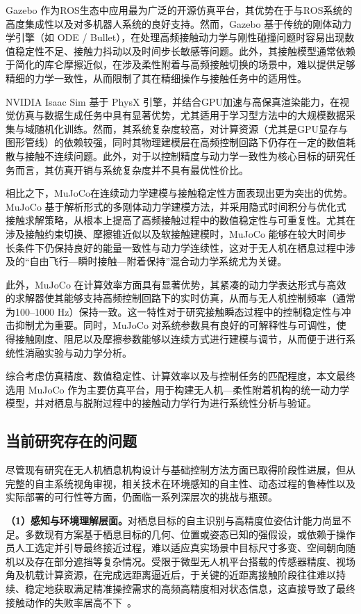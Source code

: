 Gazebo 作为ROS生态中应用最为广泛的开源仿真平台，其优势在于与ROS系统的高度集成性以及对多机器人系统的良好支持。然而，Gazebo 基于传统的刚体动力学引擎（如 ODE / Bullet），在处理高频接触动力学与刚性碰撞问题时容易出现数值稳定性不足、接触力抖动以及时间步长敏感等问题。此外，其接触模型通常依赖于简化的库仑摩擦近似，在涉及柔性附着与高频接触切换的场景中，难以提供足够精细的力学一致性，从而限制了其在精细操作与接触任务中的适用性。

NVIDIA Isaac Sim 基于 PhysX 引擎，并结合GPU加速与高保真渲染能力，在视觉仿真与数据生成任务中具有显著优势，尤其适用于学习型方法中的大规模数据采集与域随机化训练。然而，其系统复杂度较高，对计算资源（尤其是GPU显存与图形管线）的依赖较强，同时其物理建模层在高频控制回路下仍存在一定的数值耗散与接触不连续问题。此外，对于以控制精度与动力学一致性为核心目标的研究任务而言，其仿真开销与系统复杂度并不具有最优性价比。

相比之下，MuJoCo在连续动力学建模与接触稳定性方面表现出更为突出的优势。MuJoCo 基于解析形式的多刚体动力学建模方法，并采用隐式时间积分与优化式接触求解策略，从根本上提高了高频接触过程中的数值稳定性与可重复性。尤其在涉及接触约束切换、摩擦锥近似以及软接触建模时，MuJoCo 能够在较大时间步长条件下仍保持良好的能量一致性与动力学连续性，这对于无人机在栖息过程中涉及的“自由飞行—瞬时接触—附着保持”混合动力学系统尤为关键。

此外，MuJoCo 在计算效率方面具有显著优势，其紧凑的动力学表达形式与高效的求解器使其能够支持高频控制回路下的实时仿真，从而与无人机控制频率（通常为100–1000 Hz）保持一致。这一特性对于研究接触瞬态过程中的控制稳定性与冲击抑制尤为重要。同时，MuJoCo 对系统参数具有良好的可解释性与可调性，使得接触刚度、阻尼以及摩擦参数能够以连续方式进行建模与调节，从而便于进行系统性消融实验与动力学分析。

综合考虑仿真精度、数值稳定性、计算效率以及与控制任务的匹配程度，本文最终选用 MuJoCo 作为主要仿真平台，用于构建无人机—柔性附着机构的统一动力学模型，并对栖息与脱附过程中的接触动力学行为进行系统性分析与验证。

\subsection{当前研究存在的问题}

尽管现有研究在无人机栖息机构设计与基础控制方法方面已取得阶段性进展，但从完整的自主系统视角审视，相关技术在环境感知的自主性、动态过程的鲁棒性以及实际部署的可行性等方面，仍面临一系列深层次的挑战与瓶颈。

\textbf{（1）感知与环境理解层面。}对栖息目标的自主识别与高精度位姿估计能力尚显不足。多数现有方案基于栖息目标的几何、位置或姿态已知的强假设，或依赖于操作员人工选定并引导最终接近过程，难以适应真实场景中目标尺寸多变、空间朝向随机以及存在部分遮挡等复杂情况。受限于微型无人机平台搭载的传感器精度、视场角及机载计算资源，在完成远距离逼近后，于关键的近距离接触阶段往往难以持续、稳定地获取满足精准操控需求的高频高精度相对状态信息，这直接导致了最终接触动作的失败率居高不下~\cite{adams2000contact}。

